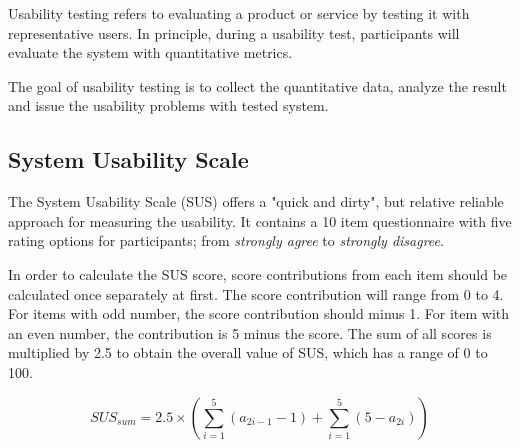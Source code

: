 Usability testing refers to evaluating a product or service by testing it with representative users. In principle, during a usability test, participants  will evaluate the system with quantitative metrics. 

The goal of usability testing is to collect the quantitative data, analyze the result and issue the usability problems with tested system. 

\subsection{System Usability Scale}

The System Usability Scale (SUS) offers a "quick and dirty", but relative reliable approach for measuring the usability\cite{brooke1996sus}.  It contains a 10 item questionnaire with five rating options for participants; from \textit{strongly agree} to \textit{strongly disagree}.


In order to calculate the SUS score, score contributions from each item should be calculated once separately at first. The score contribution will range from 0 to 4. For items with odd number, the score contribution should minus 1. For item with an even number, the contribution is 5 minus the score. The sum of all scores is multiplied by 2.5 to obtain the overall value of SUS, which has a range of 0 to 100.

\begin{equation}
\label{formular:SUS}
SUS_{sum} = 2.5 \times \left (  \sum_{ i=1}^{5} \left ( a_{2i-1} - 1 \right ) + \sum_{ i=1}^{5} \left ( 5 - a_{2i} \right ) \right ) 
\end{equation}


